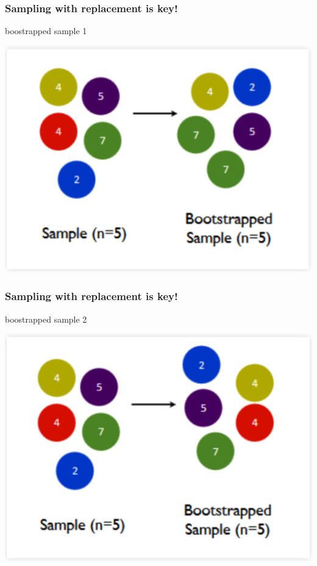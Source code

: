 \documentclass{beamer}
\newcommand{\sk}{\vspace{.5cm}}
\begin{document}
\begin{frame}
	\frametitle{Sampling with replacement is key!}
	
	boostrapped sample 1 \sk
	\begin{center}
		\includegraphics[scale=0.4]{figures/bs1}
	\end{center}

\end{frame}

\begin{frame}
	\frametitle{Sampling with replacement is key!}
	
	boostrapped sample 2 \sk
	\begin{center}
		\includegraphics[scale=0.4]{figures/bs2}
	\end{center}

\end{frame}
\end{document}
